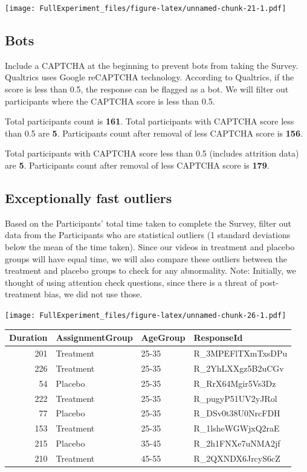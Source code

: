 \documentclass[
]{article}
\begin{document}
\texttt{[image: FullExperiment\_files/figure-latex/unnamed-chunk-21-1.pdf]}

\hypertarget{bots}{%
\subsection{Bots}\label{bots}}

Include a CAPTCHA at the beginning to prevent bots from taking the
Survey. Qualtrics uses Google reCAPTCHA technology. According to
Qualtrics, if the score is less than 0.5, the response can be flagged as
a bot. We will filter out participants where the CAPTCHA score is less
than 0.5.

Total participants count is \textbf{161}. Total participants with
CAPTCHA score less than 0.5 are \textbf{5}. Participants count after
removal of less CAPTCHA score is \textbf{156}.

Total participants with CAPTCHA score less than 0.5 (includes attrition
data) are \textbf{5}. Participants count after removal of less CAPTCHA
score is \textbf{179}.

\hypertarget{exceptionally-fast-outliers}{%
\subsection{Exceptionally fast
outliers}\label{exceptionally-fast-outliers}}

Based on the Participants' total time taken to complete the Survey,
filter out data from the Participants who are statistical outliers (1
standard deviations below the mean of the time taken). Since our videos
in treatment and placebo groups will have equal time, we will also
compare these outliers between the treatment and placebo groups to check
for any abnormality. Note: Initially, we thought of using attention
check questions, since there is a threat of post-treatment bias, we did
not use those.

\texttt{[image: FullExperiment\_files/figure-latex/unnamed-chunk-26-1.pdf]}

\begin{longtable}[]{@{}rlll@{}}
\toprule
Duration & AssignmentGroup & AgeGroup & ResponseId\tabularnewline
\midrule
\endhead
201 & Treatment & 25-35 & R\_3MPEFlTXmTxsDPu\tabularnewline
226 & Treatment & 25-35 & R\_2YhLXXgz5B2uCGv\tabularnewline
54 & Placebo & 25-35 & R\_RrX64Mgir5Vs3Dz\tabularnewline
222 & Treatment & 25-35 & R\_pugyP51UV2yJRol\tabularnewline
77 & Placebo & 25-35 & R\_DSv0t38U0NrcFDH\tabularnewline
153 & Treatment & 25-35 & R\_1lsheWGWjxQ2raE\tabularnewline
215 & Placebo & 35-45 & R\_2h1FNXe7uNMA2jf\tabularnewline
210 & Treatment & 45-55 & R\_2QXNDX6JrcyS6cZ\tabularnewline
\bottomrule
\end{longtable}
\end{document}
